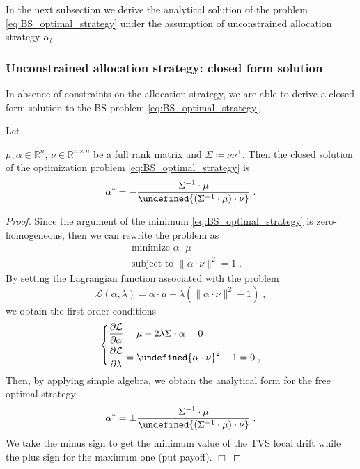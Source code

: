 \documentclass[runningheads]{m2ef}
\newcommand{\tr}[1]{{#1}^{\intercal}} %
\newenvironment{eqsys}{\begin{equation}\begin{dcases}}{\end{dcases}\end{equation}}
\let\norm\undefined %
\DeclarePairedDelimiter\norm{\lVert}{\rVert}
\newcommand\soutpars[1]{\let\helpcmd\sout\parhelp#1\par\relax\relax}
\newcommand{\change}[1]{{\color{red} {#1}}}%
\newcommand{\remove}[1]{{\color{red} \soutpars{{#1}}}}%
\begin{document}
\change{In the next subsection we derive the analytical solution of the problem \eqref{eq:BS_optimal_strategy} under the assumption of unconstrained allocation strategy $\alpha_t$.}


\subsubsection{Unconstrained \change{a}llocation \change{s}trategy: \change{c}losed \change{f}orm \change{s}olution}
In absence of constraints on the allocation strategy, we are able to derive a closed form solution to the BS problem \eqref{eq:BS_optimal_strategy}.
\begin{lemma}
	Let \remove{be} $\mu, \alpha \in \mathbb{R}^n$, $\nu \in \mathbb{R}^{n\times n}$ be a full rank matrix and $\Sigma\coloneqq \nu \tr{\nu}$. Then the closed solution of the optimization problem \eqref{eq:BS_optimal_strategy} is 
	\begin{equation}
			\alpha^* = - \frac{\Sigma^{-1} \cdot \mu}{\norm{(\Sigma^{-1} \cdot \mu)\cdot \nu}} \; .
	\end{equation}
\end{lemma}
\begin{proof}
Since the argument of the minimum \eqref{eq:BS_optimal_strategy} is zero-homogeneous, then we can rewrite the problem as
\begin{equation}
		\begin{aligned}
			&\text { minimize } \alpha \cdot \mu\\
			&\text { subject to } \|\alpha \cdot \nu\|^2=1 \; .
	\end{aligned}
\end{equation}
By setting the Lagrangian function associated with the problem
\begin{equation}
	\mathcal{L}\left(\alpha, \lambda\right)=\alpha \cdot \mu-\lambda\left(\|\alpha \cdot \nu\|^2-1\right) \; ,
\end{equation}
we obtain the first order conditions
\begin{eqsys}
	\frac{\partial \mathcal{L}}{\partial \alpha}=\mu -2\lambda \Sigma \cdot \alpha=0 \\
	\frac{\partial \mathcal{L}}{\partial \lambda}= \norm{\alpha \cdot \nu}^2-1=0
	\; ,
\end{eqsys}
Then, by applying simple algebra, we obtain the analytical form for the free optimal strategy
\begin{equation}
	\alpha^* = \pm \frac{\Sigma^{-1} \cdot \mu}{\norm{(\Sigma^{-1} \cdot \mu)\cdot \nu}} \; .
\label{eq:analytical_solution_free_strategy}\end{equation}
We take the minus sign to get the minimum value of the TVS local drift while the plus sign for the maximum one (put payoff). $\Box$
\end{proof}
\end{document}
